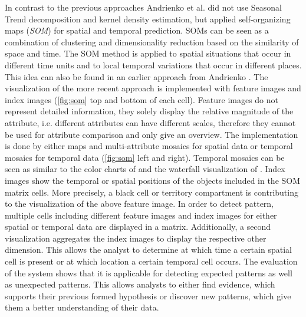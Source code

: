 \documentclass[electronic]{vgtc}             %
\begin{document}
In contrast to the previous approaches Andrienko et al. \cite{Andrienko:2010:Space} did not use Seasonal Trend decomposition and kernel density estimation, but applied self-organizing maps (\textit{SOM}) for spatial and temporal prediction.
SOMs can be seen as a combination of clustering and dimensionality reduction based on the similarity of space and time.
The SOM method is applied to spatial situations that occur in different time units and to local temporal variations that occur in different places.
This idea can also be found in an earlier approach from Andrienko \cite{Andrienko:2005}.
The visualization of the more recent approach is implemented with feature images and index images (\autoref{fig:som} top and bottom of each cell).
Feature images do not represent detailed information, they solely display the relative magnitude of the attribute, i.e. different attributes can have different scales, therefore they cannot be used for attribute comparison and only give an overview.
The implementation is done by either maps and multi-attribute mosaics for spatial data or temporal mosaics for temporal data (\autoref{fig:som} left and right).
Temporal mosaics can be seen as similar to the color charts of \cite{ichikawa:2002} and the waterfall visualization of \cite{steed:2017}.
Index images show the temporal or spatial positions of the objects included in the SOM matrix cells.
More precisely, a black cell or territory compartment is contributing to the visualization of the above feature image.  
In order to detect pattern, multiple cells including different feature images and index images for either spatial or temporal data are displayed in a matrix.
Additionally, a second visualization aggregates the index images to display the respective other dimension.
This allows the analyst to determine at which time a certain spatial cell is present or at which location a certain temporal cell occurs.
The evaluation of the system shows that it is applicable for detecting expected patterns as well as unexpected patterns.
This allows analysts to either find evidence, which supports their previous formed hypothesis or discover new patterns, which give them a better understanding of their data. 
\end{document}
